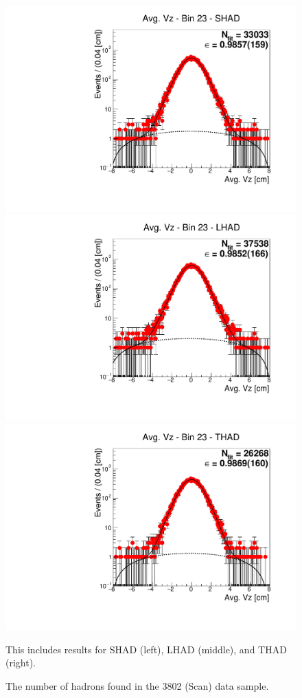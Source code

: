 \begin{figure}[H]
\centering
\includegraphics[scale=0.25]{figures/plots/nonDDbar_fit_results/scan/fit_scan_23_data_SHAD.pdf}
\hspace{-0.5cm}
\includegraphics[scale=0.25]{figures/plots/nonDDbar_fit_results/scan/fit_scan_23_data_LHAD.pdf}
\hspace{-0.5cm}
\includegraphics[scale=0.25]{figures/plots/nonDDbar_fit_results/scan/fit_scan_23_data_THAD.pdf}
\caption{The number of hadrons found in the 3802 (Scan) data sample.}
{This includes results for SHAD (left), LHAD (middle), and THAD (right).}
\label{fig:hadron_fits_scan_23}
\end{figure}

